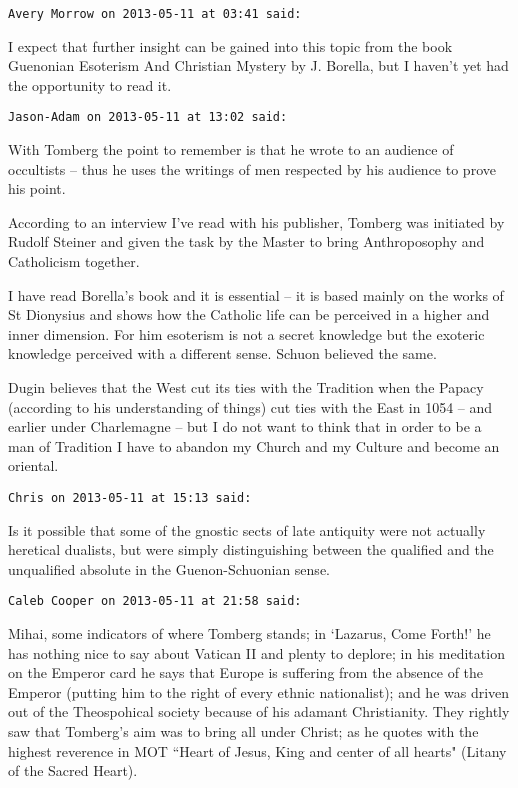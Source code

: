 \begin{footnotesize}
\begin{sffamily}
\hfill

\texttt{Avery Morrow on 2013-05-11 at 03:41 said: }

I expect that further insight can be gained into this topic from the book Guenonian Esoterism And Christian Mystery by J. Borella, but I haven't yet had the opportunity to read it.


\hfill

\texttt{Jason-Adam on 2013-05-11 at 13:02 said: }

With Tomberg the point to remember is that he wrote to an audience of occultists – thus he uses the writings of men respected by his audience to prove his point. 

According to an interview I've read with his publisher, Tomberg was initiated by Rudolf Steiner and given the task by the Master to bring Anthroposophy and Catholicism together. 

I have read Borella's book and it is essential – it is based mainly on the works of St Dionysius and shows how the Catholic life can be perceived in a higher and inner dimension. For him esoterism is not a secret knowledge but the exoteric knowledge perceived with a different sense. Schuon believed the same.

Dugin believes that the West cut its ties with the Tradition when the Papacy (according to his understanding of things) cut ties with the East in 1054 – and earlier under Charlemagne – but I do not want to think that in order to be a man of Tradition I have to abandon my Church and my Culture and become an oriental.


\hfill

\texttt{Chris on 2013-05-11 at 15:13 said: }

Is it possible that some of the gnostic sects of late antiquity were not actually heretical dualists, but were simply distinguishing between the qualified and the unqualified absolute in the Guenon-Schuonian sense.


\hfill

\texttt{Caleb Cooper on 2013-05-11 at 21:58 said: }

Mihai, some indicators of where Tomberg stands; in `Lazarus, Come Forth!' he has nothing nice to say about Vatican II and plenty to deplore; in his meditation on the Emperor card he says that Europe is suffering from the absence of the Emperor (putting him to the right of every ethnic nationalist); and he was driven out of the Theospohical society because of his adamant Christianity. They rightly saw that Tomberg's aim was to bring all under Christ; as he quotes with the highest reverence in MOT ``Heart of Jesus, King and center of all hearts" (Litany of the Sacred Heart).


\end{sffamily}
\end{footnotesize}
